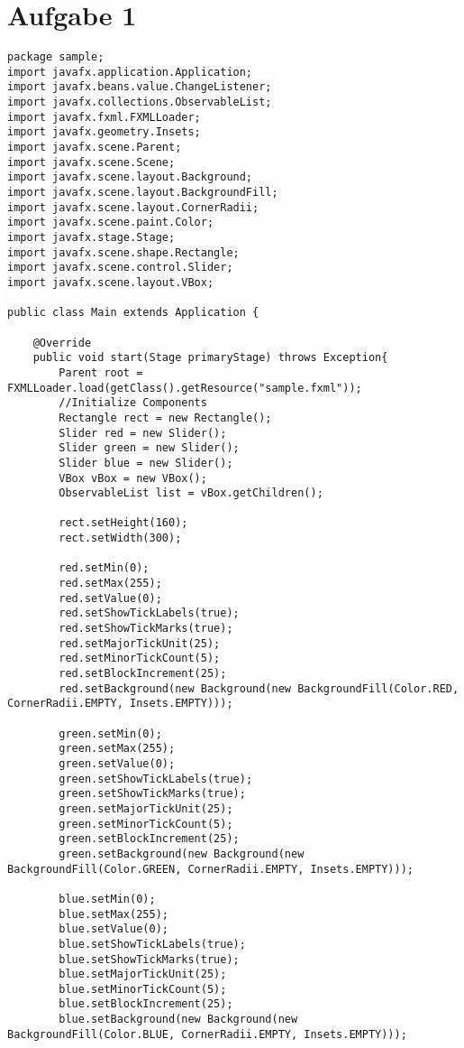 \documentclass[12pt,a4paper,oneside,ngerman]{article}
\begin{document}

\section*{Aufgabe 1}
\begin{lstlisting}
package sample;
import javafx.application.Application;
import javafx.beans.value.ChangeListener;
import javafx.collections.ObservableList;
import javafx.fxml.FXMLLoader;
import javafx.geometry.Insets;
import javafx.scene.Parent;
import javafx.scene.Scene;
import javafx.scene.layout.Background;
import javafx.scene.layout.BackgroundFill;
import javafx.scene.layout.CornerRadii;
import javafx.scene.paint.Color;
import javafx.stage.Stage;
import javafx.scene.shape.Rectangle;
import javafx.scene.control.Slider;
import javafx.scene.layout.VBox;

public class Main extends Application {

    @Override
    public void start(Stage primaryStage) throws Exception{
        Parent root = FXMLLoader.load(getClass().getResource("sample.fxml"));
        //Initialize Components
        Rectangle rect = new Rectangle();
        Slider red = new Slider();
        Slider green = new Slider();
        Slider blue = new Slider();
        VBox vBox = new VBox();
        ObservableList list = vBox.getChildren();

        rect.setHeight(160);
        rect.setWidth(300);

        red.setMin(0);
        red.setMax(255);
        red.setValue(0);
        red.setShowTickLabels(true);
        red.setShowTickMarks(true);
        red.setMajorTickUnit(25);
        red.setMinorTickCount(5);
        red.setBlockIncrement(25);
        red.setBackground(new Background(new BackgroundFill(Color.RED, CornerRadii.EMPTY, Insets.EMPTY)));

        green.setMin(0);
        green.setMax(255);
        green.setValue(0);
        green.setShowTickLabels(true);
        green.setShowTickMarks(true);
        green.setMajorTickUnit(25);
        green.setMinorTickCount(5);
        green.setBlockIncrement(25);
        green.setBackground(new Background(new BackgroundFill(Color.GREEN, CornerRadii.EMPTY, Insets.EMPTY)));

        blue.setMin(0);
        blue.setMax(255);
        blue.setValue(0);
        blue.setShowTickLabels(true);
        blue.setShowTickMarks(true);
        blue.setMajorTickUnit(25);
        blue.setMinorTickCount(5);
        blue.setBlockIncrement(25);
        blue.setBackground(new Background(new BackgroundFill(Color.BLUE, CornerRadii.EMPTY, Insets.EMPTY)));


\end{lstlisting}
\end{document}
